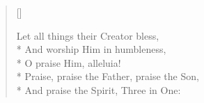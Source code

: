\begin{verse}[\versewidth]
\begin{patverse}
Let all things their Creator bless,\\*
And worship Him in humbleness,\\*
O praise Him, alleluia!\\*
Praise, praise the Father, praise the Son,\\*
And praise the Spirit, Three in One:
\end{patverse}

\end{verse}


